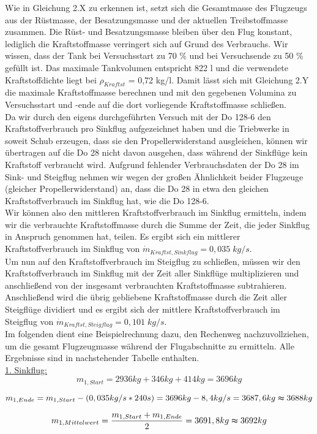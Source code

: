 Wie in Gleichung 2.X zu erkennen ist, setzt sich die Gesamtmasse des Flugzeugs aus der Rüstmasse, der Besatzungsmasse und der aktuellen Treibstoffmasse zusammen. Die Rüst- und Besatzungsmasse bleiben über den Flug konstant, lediglich die Kraftstoffmasse verringert sich auf Grund des Verbrauchs. Wir wissen, dass der Tank bei Versuchsstart zu 70 \% und bei Versuchsende zu 50 \% gefüllt ist. Das maximale Tankvolumen entspricht 822 {l} und die verwendete Kraftstoffdichte liegt bei $\rho_{Kraftst}$ = 0,72 {kg/l}. Damit lässt sich mit Gleichung 2.Y die maximale Kraftstoffmasse berechnen und mit den gegebenen Volumina zu Versuchsstart und -ende auf die dort vorliegende Kraftstoffmasse schließen.
\\
Da wir durch den eigens durchgeführten Versuch mit der Do 128-6 den Kraftstoffverbrauch pro Sinkflug aufgezeichnet haben und die Triebwerke in soweit Schub erzeugen, dass sie den Propellerwiderstand ausgleichen, können wir übertragen auf die Do 28 nicht davon ausgehen, dass während der Sinkflüge kein Kraftstoff verbraucht wird. Aufgrund fehlender Verbrauchsdaten der Do 28 im Sink- und Steigflug nehmen wir wegen der großen Ähnlichkeit beider Flugzeuge (gleicher Propellerwiderstand) an, dass die Do 28 in etwa den gleichen Kraftstoffverbrauch im Sinkflug hat, wie die Do 128-6.
\\
Wir können also den mittleren Kraftstoffverbrauch im Sinkflug ermitteln, indem wir die verbrauchte Kraftstoffmasse durch die Summe der Zeit, die jeder Sinkflug in Anspruch genommen hat, teilen. Es ergibt sich ein mittlerer Kraftstoffverbrauch im Sinkflug von $\dot{m}_{Kraftst,Sinkflug} = 0,035 \; {kg/s}$.
\\
Um nun auf den Kraftstoffverbrauch im Steigflug zu schließen, müssen wir den Kraftstoffverbrauch im Sinkflug mit der Zeit aller Sinkflüge multiplizieren und anschließend von der insgesamt verbrauchten Kraftstoffmasse subtrahieren. Anschließend wird die übrig gebliebene Kraftstoffmasse durch die Zeit aller Steigflüge dividiert und es ergibt sich der mittlere Kraftstoffverbrauch im Steigflug von $\dot{m}_{Kraftst,Steigflug} = 0,101 \; {kg/s}$.
\\ 
Im folgenden dient eine Beispielrechnung dazu, den Rechenweg nachzuvollziehen, um die gesamt Flugzeugmasse während der Flugabschnitte zu ermitteln. Alle Ergebnisse sind in nachstehender Tabelle enthalten. \\

\underline{1. Sinkflug:}
\begin{equation*}
m_{1,Start} = 2936 {kg} + 346 {kg} +414 {kg} = 3696 {kg}
\end{equation*}

\begin{equation*}
m_{1,Ende} = m_{1,Start} - (0,035 {kg/s} * 240 {s}) = 3696 {kg} - 8,4 {kg/s} = 3687,6 {kg} \thickapprox 3688 {kg}
\end{equation*}

\begin{equation*}
m_{1,Mittelwert} = \frac{m_{1,Start} + m_{1,Ende}}{2} = 3691,8 {kg} \thickapprox 3692 {kg}
\end{equation*}



\newpage